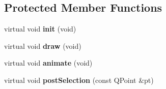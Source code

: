 \subsection*{Protected Member Functions}
\begin{DoxyCompactItemize}
\item 
\hypertarget{classSkyViewer_aaebe284253097cb2215c0d1e28ec2e14}{
virtual void {\bfseries init} (void)}
\label{classSkyViewer_aaebe284253097cb2215c0d1e28ec2e14}

\item 
\hypertarget{classSkyViewer_ab38b06e689334938ab8c266dc143ecfb}{
virtual void {\bfseries draw} (void)}
\label{classSkyViewer_ab38b06e689334938ab8c266dc143ecfb}

\item 
\hypertarget{classSkyViewer_a3cf9922b19ce277971939df8c766ba34}{
virtual void {\bfseries animate} (void)}
\label{classSkyViewer_a3cf9922b19ce277971939df8c766ba34}

\item 
\hypertarget{classSkyViewer_adcfa638eb0fb234dc8f7d5bbae6fd6d8}{
virtual void {\bfseries postSelection} (const QPoint \&pt)}
\label{classSkyViewer_adcfa638eb0fb234dc8f7d5bbae6fd6d8}

\end{DoxyCompactItemize}
